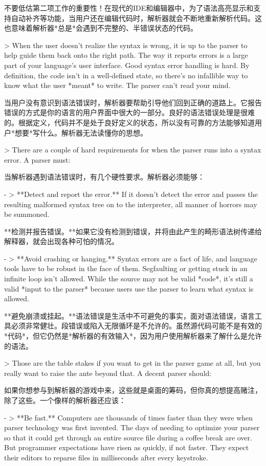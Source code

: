 \documentclass[cn,11pt,chinese]{elegantbook}
\begin{document}
不要低估第二项工作的重要性！在现代的IDE和编辑器中，为了语法高亮显示和支持自动补齐等功能，当用户还在编辑代码时，解析器就会不断地重新解析代码。这也意味着解析器*总是*会遇到不完整的、半错误状态的代码。

> When the user doesn’t realize the syntax is wrong, it is up to the parser to help guide them back onto the right path. The way it reports errors is a large part of your language’s user interface. Good syntax error handling is hard. By definition, the code isn’t in a well-defined state, so there’s no infallible way to know what the user *meant* to write. The parser can’t read your mind.

当用户没有意识到语法错误时，解析器要帮助引导他们回到正确的道路上。它报告错误的方式是你的语言的用户界面中很大的一部分。良好的语法错误处理是很难的。根据定义，代码并不是处于良好定义的状态，所以没有可靠的方法能够知道用户*想要*写什么。解析器无法读懂你的思想。

> There are a couple of hard requirements for when the parser runs into a syntax error. A parser must:

当解析器遇到语法错误时，有几个硬性要求。解析器必须能够：

- > **Detect and report the error.** If it doesn’t detect the error and passes the resulting malformed syntax tree on to the interpreter, all manner of horrors may be summoned.

  **检测并报告错误。**如果它没有检测到错误，并将由此产生的畸形语法树传递给解释器，就会出现各种可怕的情况。

- > **Avoid crashing or hanging.** Syntax errors are a fact of life, and language tools have to be robust in the face of them. Segfaulting or getting stuck in an infinite loop isn’t allowed. While the source may not be valid *code*, it’s still a valid *input to the parser* because users use the parser to learn what syntax is allowed.

  **避免崩溃或挂起。**语法错误是生活中不可避免的事实，面对语法错误，语言工具必须非常健壮。段错误或陷入无限循环是不允许的。虽然源代码可能不是有效的*代码*，但它仍然是*解析器的有效输入*，因为用户使用解析器来了解什么是允许的语法。

> Those are the table stakes if you want to get in the parser game at all, but you really want to raise the ante beyond that. A decent parser should:

如果你想参与到解析器的游戏中来，这些就是桌面的筹码，但你真的想提高赌注，除了这些。一个像样的解析器还应该：

- > **Be fast.** Computers are thousands of times faster than they were when parser technology was first invented. The days of needing to optimize your parser so that it could get through an entire source file during a coffee break are over. But programmer expectations have risen as quickly, if not faster. They expect their editors to reparse files in milliseconds after every keystroke.
\end{document}

